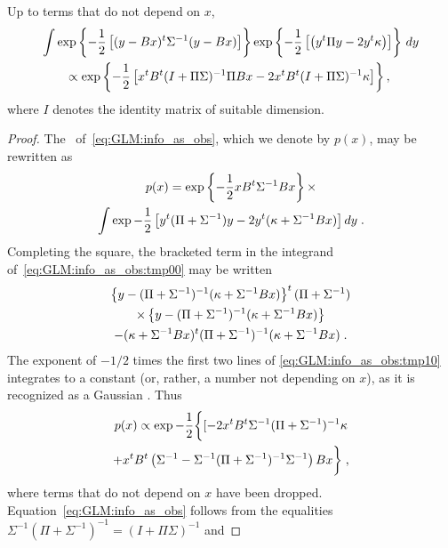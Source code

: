 \begin{lem} Up to terms that do not depend on $x$,
  \label{lem:GLM:info_as_obs}
  \begin{multline}
    \label{eq:GLM:info_as_obs}
    \int \exp \left\{ -\frac12 \left[ (y-Bx)^t\Sigma^{-1}(y-Bx)\right] \right\}
    \exp \left\{-\frac12\left[ \left(y^t \Pi y -2 y^t\kappa\right)\right]\right\}\, dy \\
    \propto \exp \left\{ -\frac12 \left[x^t B^t(I+\Pi\Sigma)^{-1}\Pi B x -2 x^t B^t (I+\Pi\Sigma)^{-1} \kappa \right] \right\}, \;
  \end{multline}
  where $I$ denotes the identity matrix of suitable dimension.
\end{lem}

\begin{proof}
  The \lhs\ of~\eqref{eq:GLM:info_as_obs}, which we denote by $p(x)$, may be
  rewritten as
  \begin{multline}
    \label{eq:GLM:info_as_obs:tmp00}
    p(x) = \exp \left\{ -\frac12 x B^t\Sigma^{-1}B x \right\} \times
    \\ \int \exp -\frac12 \left[ y^t(\Pi+\Sigma^{-1}) y - 2 y^t (\kappa + \Sigma^{-1}B x) \right] dy \; .
  \end{multline}
  Completing the square, the bracketed term in the integrand of~\eqref{eq:GLM:info_as_obs:tmp00} may be written
  \begin{multline}
    \label{eq:GLM:info_as_obs:tmp10}
    \left\{y-(\Pi+\Sigma^{-1})^{-1} (\kappa+\Sigma^{-1}Bx)\right\}^t (\Pi+\Sigma^{-1}) \\
    \times \left\{y-(\Pi+\Sigma^{-1})^{-1} (\kappa+\Sigma^{-1}Bx)\right\}\\
    - (\kappa+\Sigma^{-1}Bx)^t (\Pi+\Sigma^{-1})^{-1} (\kappa+\Sigma^{-1}Bx)\; .
  \end{multline}
  The exponent of $-1/2$ times the first two lines of \eqref{eq:GLM:info_as_obs:tmp10}
  integrates to a constant (or, rather, a number not depending on $x$),
  as it is recognized as a Gaussian \pdf. Thus
  \begin{multline}
    \label{eq:GLM:info_as_obs:tmp20}
    p(x) \propto \exp -\frac12\bigg\{[-2x^tB^t\Sigma^{-1}(\Pi+\Sigma^{-1})^{-1}\kappa \\ + x^t B^t \left(\Sigma^{-1} - \Sigma^{-1}(\Pi+\Sigma^{-1})^{-1}\Sigma^{-1}\right)B x\biggr\} \; ,
  \end{multline}
  where terms that do not depend on $x$ have been dropped.
  Equation~\eqref{eq:GLM:info_as_obs} follows from the equalities
  $\Sigma^{-1}(\Pi+\Sigma^{-1})^{-1} = (I + \Pi\Sigma)^{-1}$ and

\end{proof}
